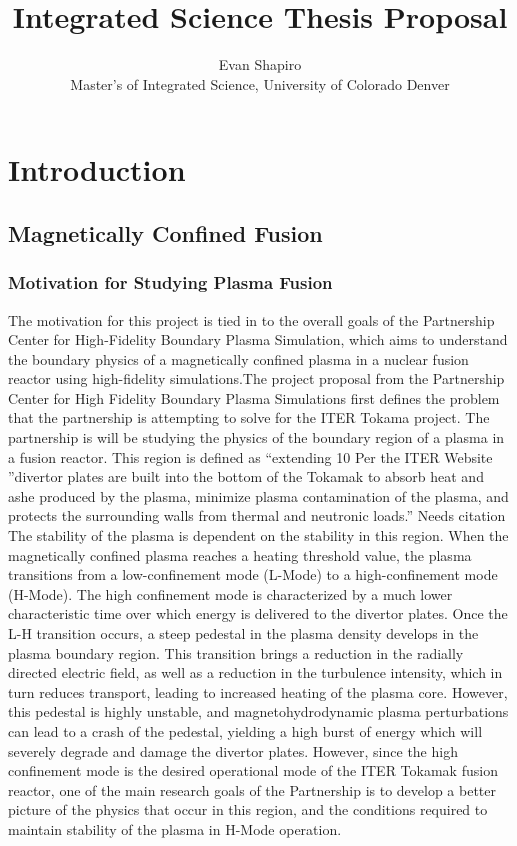 \documentclass{article}
\title{Integrated Science Thesis Proposal}
\author{Evan Shapiro \\ Master's of Integrated Science, University of Colorado Denver}
\begin{document}
\maketitle
\tableofcontents
\section{Introduction}
\subsection{Magnetically Confined Fusion}
\subsubsection{Motivation for Studying Plasma Fusion}
The motivation for this project is tied in to the overall goals of the Partnership Center for High-Fidelity Boundary Plasma Simulation, which aims to understand the boundary physics of a magnetically confined plasma in a nuclear fusion reactor using high-fidelity simulations.The project proposal from the Partnership Center for High Fidelity Boundary Plasma Simulations first defines the problem that the partnership is attempting to solve for the ITER Tokama project. The partnership is will be studying the physics of the boundary region of a plasma in a fusion reactor. This region is defined as “extending 10%
Per the ITER Website ”divertor plates are built into the bottom of the Tokamak to absorb heat and ashe produced by the plasma, minimize plasma contamination of the plasma, and protects the surrounding walls from thermal and neutronic loads.”  Needs citation
The stability of the plasma is dependent on the stability in this region. When the magnetically confined plasma reaches a heating threshold value, the plasma transitions from a low-confinement mode (L-Mode) to a high-confinement mode (H-Mode). The high confinement mode is characterized by a much lower characteristic time over which energy is delivered to the divertor plates. 
Once the L-H transition occurs, a steep pedestal in the plasma density develops in the plasma boundary region. This transition brings a reduction in the radially directed electric field, as well as a reduction in the turbulence intensity, which in turn reduces transport, leading to increased heating of the plasma core. However, this pedestal is highly unstable, and magnetohydrodynamic plasma perturbations can lead to a crash of the pedestal, yielding a high burst of energy which will severely degrade and damage the divertor plates. However, since the high confinement mode is the desired operational mode of the ITER Tokamak fusion reactor, one of the main research goals of the Partnership is to develop a better picture of the physics that occur in this region, and the conditions required to maintain stability of the plasma in H-Mode operation.
\end{document}
